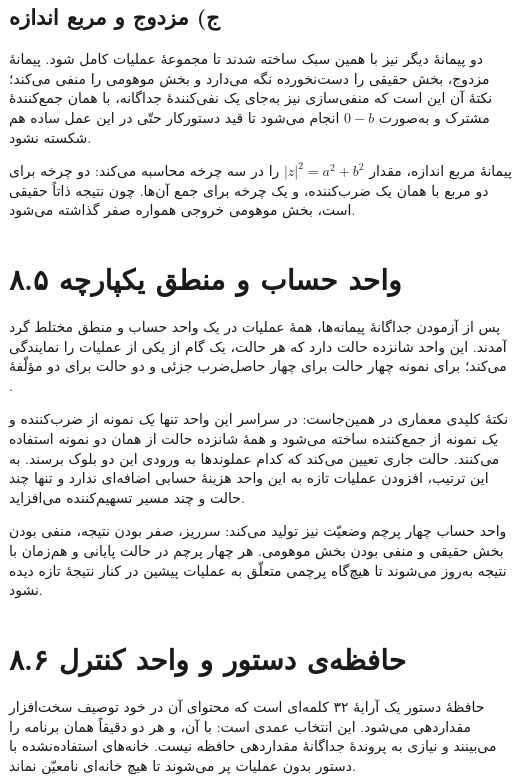\documentclass[12pt,a4paper]{article}
\begin{document}
	\subsection*{ج) مزدوج و مربع اندازه}
	دو پیمانهٔ دیگر نیز با همین سبک ساخته شدند تا مجموعهٔ عملیات کامل شود. پیمانهٔ مزدوج، بخش حقیقی را دست‌نخورده نگه می‌دارد و بخش موهومی را منفی می‌کند؛ نکتهٔ آن این است که منفی‌سازی نیز به‌جای یک نفی‌کنندهٔ جداگانه، با همان جمع‌کنندهٔ مشترک و به‌صورت \(0-b\) انجام می‌شود تا قید دستورکار حتّی در این عمل ساده هم شکسته نشود.


	پیمانهٔ مربع اندازه، مقدار \(|z|^2 = a^2 + b^2\) را در سه چرخه محاسبه می‌کند: دو چرخه برای دو مربع با همان یک ضرب‌کننده، و یک چرخه برای جمع آن‌ها. چون نتیجه ذاتاً حقیقی است، بخش موهومی خروجی همواره صفر گذاشته می‌شود.


	\section*{۸.۵ واحد حساب و منطق یکپارچه}
	پس از آزمودن جداگانهٔ پیمانه‌ها، همهٔ عملیات در یک واحد حساب و منطق مختلط گرد آمدند. این واحد شانزده حالت دارد که هر حالت، یک گام از یکی از عملیات را نمایندگی می‌کند؛ برای نمونه چهار حالت برای چهار حاصل‌ضرب جزئی  و دو حالت برای دو مؤلّفهٔ .

	نکتهٔ کلیدی معماری در همین‌جاست: در سراسر این واحد تنها \emph{یک} نمونه از ضرب‌کننده و \emph{یک} نمونه از جمع‌کننده ساخته می‌شود و همهٔ شانزده حالت از همان دو نمونه استفاده می‌کنند. حالت جاری تعیین می‌کند که کدام عملوندها به ورودی این دو بلوک برسند. به این ترتیب، افزودن عملیات تازه به این واحد هزینهٔ حسابی اضافه‌ای ندارد و تنها چند حالت و چند مسیر تسهیم‌کننده می‌افزاید.

	واحد حساب چهار پرچم وضعیّت نیز تولید می‌کند: سرریز، صفر بودن نتیجه، منفی بودن بخش حقیقی و منفی بودن بخش موهومی. هر چهار پرچم در حالت پایانی و هم‌زمان با نتیجه به‌روز می‌شوند تا هیچ‌گاه پرچمی متعلّق به عملیات پیشین در کنار نتیجهٔ تازه دیده نشود.


	\section*{۸.۶ حافظه‌ی دستور و واحد کنترل}
	حافظهٔ دستور یک آرایهٔ ۳۲ کلمه‌ای است که محتوای آن در خود توصیف سخت‌افزار مقداردهی می‌شود. این انتخاب عمدی است: با آن،  و  هر دو دقیقاً همان برنامه را می‌بینند و نیازی به پروندهٔ جداگانهٔ مقداردهی حافظه نیست. خانه‌های استفاده‌نشده با دستور بدون عملیات پر می‌شوند تا هیچ خانه‌ای نامعیّن نماند.
\end{document}
